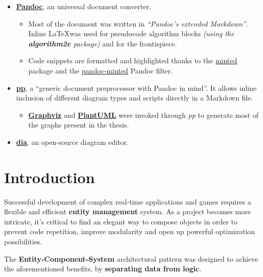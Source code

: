\documentclass[twoside, 12pt, a4paper, openright]{book}
\providecommand{\tightlist}{%
  \setlength{\itemsep}{0pt}\setlength{\parskip}{0pt}}
\begin{document}
\begin{itemize}
\item
  \href{http://pandoc.org/}{\textbf{Pandoc}}, an universal document
  converter.

  \begin{itemize}
  \item
    Most of the document was written in \emph{``Pandoc's extended
    Markdown''}. Inline \LaTeX was used for pseudocode algorithm blocks
    \emph{(using the \textbf{algorithm2e} package)} and for the
    frontispiece.
  \item
    Code snippets are formatted and highlighted thanks to the
    \href{https://github.com/gpoore/minted}{minted} package and the
    \href{https://github.com/nick-ulle/pandoc-minted}{pandoc-minted}
    Pandoc filter.
  \end{itemize}
\item
  \href{https://github.com/CDSoft/pp}{\textbf{pp}}, a ``generic document
  preprocessor with Pandoc in mind''. It allows inline inclusion of
  different diagram types and scripts directly in a Markdown file.

  \begin{itemize}
  \tightlist
  \item
    \href{http://www.graphviz.org}{\textbf{Graphviz}} and
    \href{http://plantuml.com/}{\textbf{PlantUML}} were invoked through
    \emph{pp} to generate most of the graphs present in the thesis.
  \end{itemize}
\item
  \href{http://dia-installer.de/}{\textbf{dia}}, an open-source diagram
  editor.
\end{itemize}

\newpage

\tableofcontents

\chapter{Introduction}\label{introduction}

Successful development of complex real-time applications and games
requires a flexible and efficient \textbf{entity management} system. As
a project becomes more intricate, it's critical to find an elegant way
to compose objects in order to prevent code repetition, improve
modularity and open up powerful optimization possibilities.

The \textbf{Entity-Component-System} architectural pattern was designed
to achieve the aforementioned benefits, by \textbf{separating data from
logic}.
\end{document}
